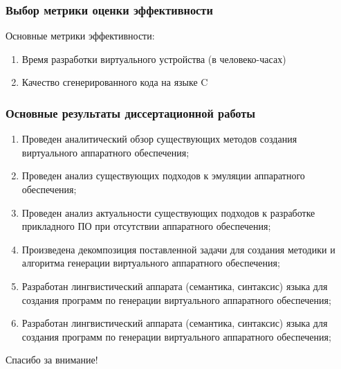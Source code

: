 \begin{frame}%
    \frametitle{Выбор метрики оценки эффективности}
    Основные метрики эффективности:
    \begin{enumerate}
        \item Время разработки виртуального устройства (в человеко-часах)
        \item Качество сгенерированного кода на языке C
    \end{enumerate}
\end{frame}


\begin{frame}%
    \frametitle{Основные результаты диссертационной работы}
    \begin{enumerate}
        \item Проведен аналитический обзор существующих методов создания виртуального аппаратного обеспечения;
        \item Проведен анализ существующих подходов к эмуляции аппаратного обеспечения;
        \item Проведен анализ актуальности существующих подходов к разработке прикладного ПО при отсутствии аппаратного обеспечения;
        \item Произведена декомпозиция поставленной задачи для создания методики и алгоритма генерации виртуального аппаратного обеспечения;
        \item Разработан лингвистический аппарата (семантика, синтаксис) языка для создания программ по генерации виртуального
            аппаратного обеспечения;
        \item Разработан лингвистический аппарата (семантика, синтаксис) языка для создания программ по генерации виртуального аппаратного обеспечения;
    \end{enumerate}
\end{frame}


\begin{frame}%
    \begin{center}
        \Huge Спасибо за внимание!
    \end{center}
\end{frame}
